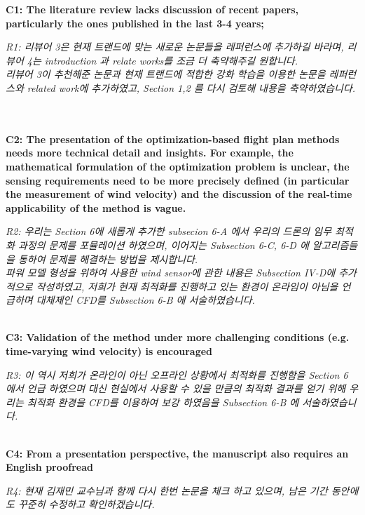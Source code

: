 \documentclass[onecolumn]{IEEEconf}
\begin{document}
\begin{description}
    \item \textbf
	{
	C1: The literature review lacks discussion of recent papers, particularly the ones published in the last 3-4 years; 
	}
	\item \textit
	{
	R1: 리뷰어 3은 현재 트랜드에 맞는 새로운 논문들을 레퍼런스에 추가하길 바라며, 리뷰어 4는 introduction 과 relate works를 조금 더 축약해주길 원합니다.\\
	리뷰어 3이 추천해준 논문과 현재 트랜드에 적합한 강화 학습을 이용한 논문을 레퍼런스와 related work에 추가하였고, Section 1,2 를 다시 검토해 내용을 축약하였습니다. 
	}
	~\\
	~\\
	\item \textbf
	{
	C2: The presentation of the optimization-based flight plan methods needs more technical detail and insights. For example, the mathematical formulation of the optimization problem is unclear, the sensing requirements need to be more precisely defined (in particular the measurement of  wind velocity) and the discussion of the real-time applicability of the method is vague.
	}
	\item \textit
	{
	R2: 우리는 Section 6에 새롭게 추가한 subsecion 6-A 에서 우리의 드론의 임무 최적화 과정의 문제를 포뮬레이션 하였으며, 이어지는 Subsection 6-C, 6-D 에 알고리즘들을 통하여 문제를 해결하는 방법을 제시합니다.~\\
	파워 모델 형성을 위하여 사용한 wind sensor에 관한 내용은 Subsection IV-D에 추가적으로 작성하였고, 저희가 현재 최적화를 진행하고 있는 환경이 온라임이 아님을 언급하며 대체제인 CFD를 Subsection 6-B 에 서술하였습니다.	}
    ~\\
    ~\\
	\item \textbf
	{
	C3: Validation of the method under more challenging conditions (e.g. time-varying wind velocity) is encouraged
	}
	\item \textit
	{
	R3: 이 역시 저희가 온라인이 아닌 오프라인 상황에서 최적화를 진행함을 Section 6 에서 언급 하였으며 대신 현실에서 사용할 수 있을 만큼의 최적화 결과를 얻기 위해 우리는 최적화 환경을 CFD를 이용하여 보강 하였음을 Subsection 6-B 에 서술하였습니다.
	}
	~\\
	~\\
	\item \textbf
	{
	C4: From a presentation perspective, the manuscript also requires an English proofread 
	}
	\item \textit
	{
	R4: 현재 김재민 교수님과 함께 다시 한번 논문을 체크 하고 있으며, 남은 기간 동안에도 꾸준히 수정하고 확인하겠습니다.
	}
	~\\
	~\\
\end{description}
    
\end{document}
